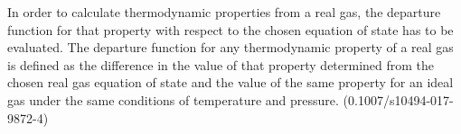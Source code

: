 \documentclass[../Article_Model_Parameters.tex]{subfiles}
\begin{document}
    In order to calculate thermodynamic properties from a real gas, the departure function for that property with respect to the chosen equation of state has to be evaluated. The departure function for any thermodynamic property of a real gas is defined as the difference in the value of that property determined from the chosen real gas equation of state and the value of the same property for an ideal gas under the same conditions of temperature and pressure. (0.1007/s10494-017-9872-4)

			
			
\end{document}
